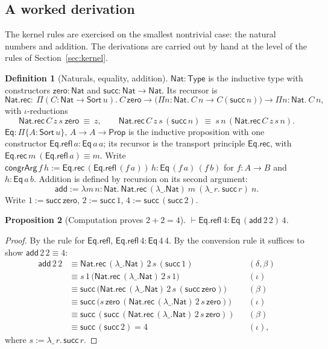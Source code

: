 \documentclass[11pt]{article}
\newcommand{\Sort}{\mathsf{Sort}}
\newcommand{\Prop}{\mathsf{Prop}}
\newcommand{\Type}{\mathsf{Type}}
\theoremstyle{definition}
\newtheorem{definition}{Definition}[section]
\theoremstyle{plain}
\newtheorem{proposition}[definition]{Proposition}
\theoremstyle{remark}
\begin{document}
\subsection{A worked derivation}\label{sec:worked}

The kernel rules are exercised on the smallest nontrivial case: the natural numbers and addition. The derivations are carried out by hand at the level of the rules of Section~\ref{sec:kernel}.

\begin{definition}[Naturals, equality, addition]\label{def:nat}
$\mathsf{Nat}:\Type$ is the inductive type with constructors $\mathsf{zero}:\mathsf{Nat}$ and $\mathsf{succ}:\mathsf{Nat}\to\mathsf{Nat}$. Its recursor is
\[
\mathsf{Nat.rec}:\ \Pi(C:\mathsf{Nat}\to\Sort\,u).\ C\,\mathsf{zero}\to\big(\Pi n{:}\mathsf{Nat}.\ C\,n\to C(\mathsf{succ}\,n)\big)\to\Pi n{:}\mathsf{Nat}.\ C\,n,
\]
with $\iota$-reductions
\[
\mathsf{Nat.rec}\,C\,z\,s\ \mathsf{zero}\ \equiv\ z,\qquad
\mathsf{Nat.rec}\,C\,z\,s\,(\mathsf{succ}\,n)\ \equiv\ s\,n\,(\mathsf{Nat.rec}\,C\,z\,s\,n).
\]
$\mathsf{Eq}:\Pi\{A:\Sort\,u\},\,A\to A\to\Prop$ is the inductive proposition with one constructor $\mathsf{Eq.refl}\,a:\mathsf{Eq}\,a\,a$; its recursor is the transport principle $\mathsf{Eq.rec}$, with $\mathsf{Eq.rec}\,m\ (\mathsf{Eq.refl}\,a)\equiv m$. Write $\mathsf{congrArg}\,f\,h:=\mathsf{Eq.rec}\,(\mathsf{Eq.refl}\,(f\,a))\,h:\mathsf{Eq}\,(f\,a)\,(f\,b)$ for $f:A\to B$ and $h:\mathsf{Eq}\,a\,b$. Addition is defined by recursion on its second argument:
\[
\mathsf{add}:=\lambda m\,n{:}\mathsf{Nat}.\ \mathsf{Nat.rec}\,(\lambda\_.\mathsf{Nat})\ m\ (\lambda\_\,r.\ \mathsf{succ}\,r)\ n .
\]
Write $1:=\mathsf{succ}\,\mathsf{zero}$, $2:=\mathsf{succ}\,1$, $4:=\mathsf{succ}\,(\mathsf{succ}\,2)$.
\end{definition}

\begin{proposition}[Computation proves $2+2=4$]\label{prop:2p2}
$\vdash\mathsf{Eq.refl}\,4:\mathsf{Eq}\,(\mathsf{add}\,2\,2)\,4$.
\end{proposition}
\begin{proof}
By the rule for $\mathsf{Eq.refl}$, $\mathsf{Eq.refl}\,4:\mathsf{Eq}\,4\,4$. By the conversion rule it suffices to show $\mathsf{add}\,2\,2\equiv4$:
\begin{align*}
\mathsf{add}\,2\,2&\equiv\mathsf{Nat.rec}\,(\lambda\_.\mathsf{Nat})\,2\,s\,(\mathsf{succ}\,1) &&(\delta,\beta)\\
&\equiv s\,1\,\big(\mathsf{Nat.rec}\,(\lambda\_.\mathsf{Nat})\,2\,s\,1\big) &&(\iota)\\
&\equiv\mathsf{succ}\,\big(\mathsf{Nat.rec}\,(\lambda\_.\mathsf{Nat})\,2\,s\,(\mathsf{succ}\,\mathsf{zero})\big) &&(\beta)\\
&\equiv\mathsf{succ}\,\big(s\,\mathsf{zero}\,(\mathsf{Nat.rec}\,(\lambda\_.\mathsf{Nat})\,2\,s\,\mathsf{zero})\big) &&(\iota)\\
&\equiv\mathsf{succ}\,(\mathsf{succ}\,(\mathsf{Nat.rec}\,(\lambda\_.\mathsf{Nat})\,2\,s\,\mathsf{zero})) &&(\beta)\\
&\equiv\mathsf{succ}\,(\mathsf{succ}\,2)=4 &&(\iota),
\end{align*}
where $s:=\lambda\_\,r.\,\mathsf{succ}\,r$.
\end{proof}
\end{document}
